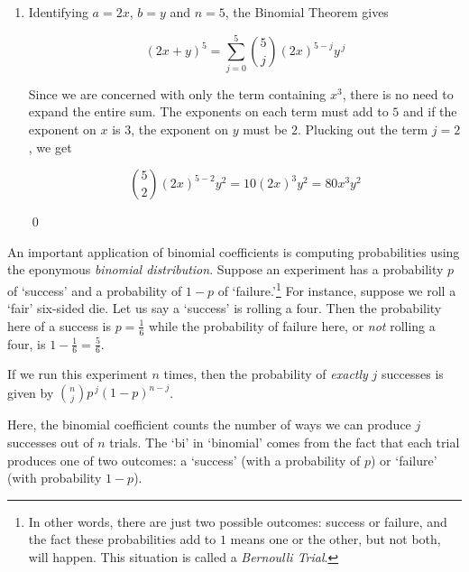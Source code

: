 \documentclass{ximera}
\begin{document}
\begin{example}
\begin{enumerate}
\[\begin{array}{rcl}
(2+0.1)^3 & = & \displaystyle{\sum_{j=0}^{3} \binom{3}{j} 2^{3-j} (0.1) ^{\, j}} \\  
        & = & \displaystyle{\binom{3}{0} 2^{3-0}(0.1)^{0} + \binom{3}{1} 2^{3-1} (0.1)^{1} + \binom{3}{2} 2^{3-2}(0.1)^{2} + \binom{3}{3} 2^{3-3}(0.1)^{3}} \\  
        & = & 8 + 1.2 + 0.06 + 0.001 \\
        & = & 9.261 \\
\end{array} \]

\item  Identifying $a = 2x$, $b = y$ and $n=5$, the Binomial Theorem gives 

\[ (2x+y)^{5} = \displaystyle{\sum_{j=0}^{5} \binom{5}{j} (2x)^{5-j} y^{\, j}} \]

Since we are concerned with only the term containing $x^3$, there is no need to expand the entire sum.  The exponents on each term must add to $5$ and if the exponent on $x$ is $3$, the exponent on $y$ must be $2$.  Plucking out the term $j=2$, we get

\[  \displaystyle{\binom{5}{2} (2x)^{5-2} y^{2}} = 10 (2x)^3y^2 = 80x^3y^2 \]

\qed


\end{enumerate}
\end{example}


An important application of binomial coefficients is computing probabilities using the eponymous \textit{binomial distribution}.  Suppose an experiment has a probability $p$ of `success' and a probability of $1-p$ of `failure.'\footnote{In other words, there are just two possible outcomes: success or failure, and the fact these probabilities add to $1$ means one or the other, but not both, will happen.  This situation is called a \textit{Bernoulli Trial}.}   For instance, suppose we roll a `fair' six-sided die.  Let us say a `success' is rolling a four. Then the probability here of a success is $p = \frac{1}{6}$ while the probability of failure here, or \textit{not} rolling a four,  is $1-\frac{1}{6} = \frac{5}{6}$.

 

If we run this experiment  $n$ times, then the probability of \textit{exactly} $j$ successes is given by $\displaystyle{\binom{n}{j} p^{\, j} (1-p)^{n-j}}$.    

\newpage

Here,  the binomial coefficient  counts the number of ways we can produce $j$ successes out of $n$ trials.  The `bi' in `binomial' comes from the fact that each trial produces one of two outcomes:  a `success' (with a probability of $p$) or `failure' (with probability $1-p$).  
\end{document}
